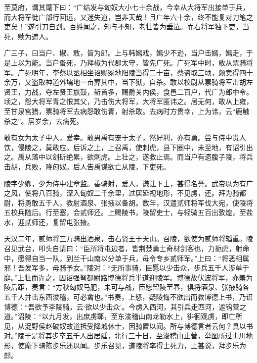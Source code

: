 \documentclass[12pt,UTF8]{ctexbook}
\begin{document}
至莫府，谓其麾下曰：“广结发与匈奴大小七十余战，今幸从大将军出接单于兵，而大将军徙广部行回远，又迷失道，岂非天哉！且广年六十余，终不能复对刀笔之吏矣！”遂引刀自刭。百姓闻之，知与不知，老壮皆为垂泣。而右将军独下吏，当死，赎为遮人。



广三子，曰当户、椒、敢，皆为郎。上与韩嫣戏，嫣少不逊，当户击嫣，嫣走，于是上以为能。当户蚤死，乃拜椒为代郡太守，皆先广死。广死军中时，敢从票骑将军。广死明年，李蔡以丞相坐诏赐冢地阳陵当得二十亩，蔡盗取三顷，颇卖得四十余万，又盗取神道外壖地一亩葬其中，当下狱，自杀。敢以校尉从票骑将军击胡左贤王，力战，夺左贤王旗鼓，斩首多，赐爵关内侯，食邑二百户，代广为郎中令。顷之，怨大将军青之恨其父，乃击伤大将军，大将军匿讳之。居无何，敢从上雍，至甘泉宫猎，票骑将军去病怨敢伤青，射杀敢。去病时方贵幸，上为讳，云“鹿触杀之”。居岁余，去病死。



敢有女为太子中人，爱幸。敢男禹有宠于太子，然好利，亦有勇。尝与侍中贵人饮，侵陵之，莫敢应。后诉之上，上召禹，使刺虎，县下圈中，未至地，有诏引出之。禹从落中以剑斫绝累，欲刺虎。上壮之，遂救止焉。而当户有遗腹子陵，将兵击胡，兵败，降匈奴。后人告禹谋欲亡从陵，下吏死。



陵字少卿，少为侍中建章监。善骑射，爱人，谦让下士，甚得名誉。武帝以为有广之风，使将八百骑，深入匈奴二千余里，过居延视地形，不见虏，还。拜为骑都尉，将勇敢五千人，教射酒泉、张掖以备胡。数年，汉遣贰师将军伐大宛，使陵将五校兵随后。行至塞，会贰师还。上赐陵书，陵留吏士，与轻骑五百出敦煌，至盐水，迎贰师还，复留屯张掖。



天汉二年，贰师将三万骑出酒泉，击右贤王于天山。召陵，欲使为贰师将辎重。陵召见武台，叩头自请曰：“臣所将屯边者，皆荆楚勇士奇材剑客也，力扼虎，射命中，愿得自当一队，到兰干山南以分单于兵，毋令专乡贰师军。”上曰：“将恶相属邪！吾发军多，毋骑予女。”陵对：“无所事骑，臣愿以少击众，步兵五千人涉单于庭。”上壮而许之，因诏强弩都尉路博德将兵半道迎陵军。博德故伏波将军，亦羞为陵后距，奏言：“方秋匈奴马肥，未可与战，臣愿留陵至春，俱将酒泉、张掖骑各五千人并击东西浚稽，可必禽也。”书奏，上怒，疑陵悔不欲出而教博德上书，乃诏博德：“吾欲予李陵骑，云‘欲以少击众’。今虏入西河，其引兵走西河，遮钩营之道。”诏陵：“以九月发，出庶虏鄣，至东浚稽山南龙勒水上，徘徊观虏，即亡所见，从浞野侯赵破奴故道抵受降城休士，因骑置以闻。所与博德言者云何？具以书对。”陵于是将其步卒五千人出居延，北行三十日，至浚稽山止营，举图所过山川地形，使麾下骑陈步乐还以闻。步乐召见，道陵将率得士死力，上甚说，拜步乐为郎。
\end{document}

